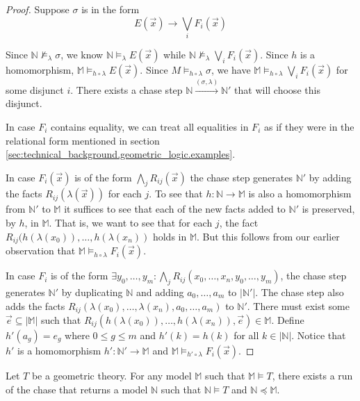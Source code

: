 		\begin{proof}

			Suppose $\sigma$ is in the form
				\[
				E(\vec{x}) \to \bigvee_i F_i(\vec{x})
				\]

			Since $\mathbb{N} \not\models_\lambda \sigma$, we know $\mathbb{N}
			\models_\lambda E(\vec{x})$ while $\mathbb{N} \not\models_\lambda
			\bigvee_i F_i(\vec{x})$. Since $h$ is a homomorphism, $\mathbb{M}
			\models_{h\circ\lambda} E(\vec{x})$. Since $M
			\models_{h\circ\lambda} \sigma$, we have $\mathbb{M}
			\models_{h\circ\lambda} \bigvee_i F_i(\vec{x})$ for some disjunct
			$i$. There exists a chase step $\mathbb{N}
			\xrightarrow{(\sigma,\lambda)} \mathbb{N}'$ that will choose this
			disjunct.

			In case $F_i$ contains equality, we can treat all equalities in
			$F_i$ as if they were in the relational form mentioned in section
			\ref{sec:technical_background.geometric_logic.examples}.

			In case $F_i(\vec x)$ is of the form $\bigwedge_j R_{ij}(\vec x)$
			the chase step generates $\mathbb{N}'$ by adding the facts
			$R_{ij}(\lambda(\vec{x}))$ for each $j$. To see that $h :
			\mathbb{N} \to \mathbb{M}$ is also a homomorphism from
			$\mathbb{N}'$ to $\mathbb{M}$ it suffices to see that each of the
			new facts added to $\mathbb{N}'$ is preserved, by $h$, in
			$\mathbb{M}$. That is, we want to see that for each $j$, the fact
			$R_{ij}(h(\lambda(x_0)),\ldots,h(\lambda(x_n))$ holds in
			$\mathbb{M}$. But this follows from our earlier observation that
			$\mathbb{M} \models_{h\circ\lambda} F_i(\vec x)$.

			In case $F_i$ is of the form $\exists y_0,\ldots,y_m : \bigwedge_j
			R_{ij}(x_0,\ldots,x_n,y_0,\ldots,y_m)$, the chase step generates
			$\mathbb{N}'$ by duplicating $\mathbb{N}$ and adding $a_0,\ldots,a_m$
			to $|\mathbb{N}'|$. The chase step also adds the facts
			$R_{ij}(\lambda(x_0),\ldots,\lambda(x_n),a_0,\ldots,a_m)$ to
			$\mathbb{N}'$. There must exist some $\vec e \subseteq
			|\mathbb{M}|$ such that
			$R_{ij}(h(\lambda(x_0)),\ldots,h(\lambda(x_n)),\vec e) \in
			\mathbb{M}$.  Define $h'(a_g) = e_g$ where $0 \le g \le m$ and
			$h'(k) = h(k)$ for all $k \in |\mathbb{N}|$.  Notice that $h'$ is a
			homomorphism $h' : \mathbb{N}' \to \mathbb{M}$ and $\mathbb{M}
			\models_{h'\circ\lambda} F_i(\vec x)$.

		\end{proof}

		\begin{theorem}
			Let $T$ be a geometric theory. For any model $\mathbb{M}$ such that
			$\mathbb{M} \models T$, there exists a run of the chase that
			returns a model $\mathbb{N}$ such that $\mathbb{N} \models T$ and
			$\mathbb{N} \preceq \mathbb{M}$.
		\end{theorem}

